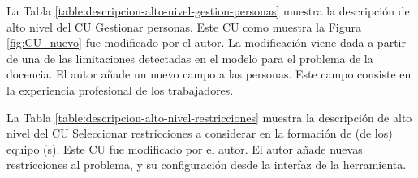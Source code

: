 \begin{table}[H]
	\centering
	\caption{Descripción de alto nivel del CU Importar roles} \label{table:descripcion-alto-nivel-imp-role}
\end{table}

La Tabla \ref{table:descripcion-alto-nivel-gestion-personas} muestra la descripción de alto nivel del CU Gestionar personas. Este CU como muestra la Figura \ref{fig:CU_nuevo} fue modificado por el autor. La modificación viene dada a partir de una de las limitaciones detectadas en el modelo para el problema de la docencia. El autor añade un nuevo campo a las personas. Este campo consiste en la experiencia profesional de los trabajadores.

\begin{table}[H]
	\centering
	\caption{Descripción de alto nivel del CU Gestionar personas} \label{table:descripcion-alto-nivel-gestion-personas}
\end{table}

La Tabla \ref{table:descripcion-alto-nivel-restricciones} muestra la descripción de alto nivel del CU Seleccionar restricciones a considerar en la formación de (de los) equipo (s). Este CU fue modificado por el autor. El autor añade nuevas restricciones al problema, y su configuración desde la interfaz de la herramienta.

